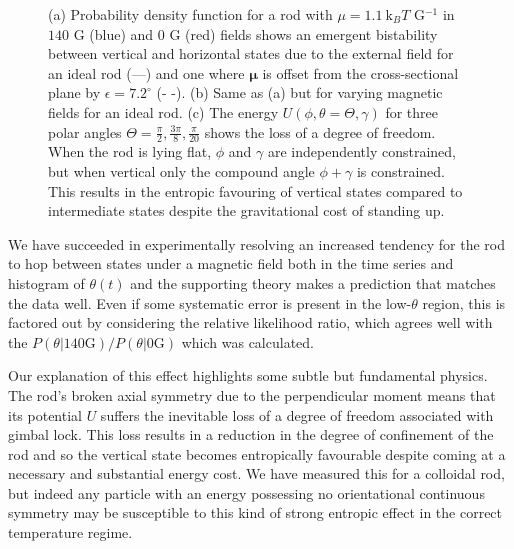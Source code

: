 \documentclass[aps,prl,reprint,twocolumn,superscriptaddress,showpacs]{revtex4-1}
\newcommand{\vc}[1]{\boldsymbol{#1}}
\newcommand{\kk}{\mathrm{k}_B}
\begin{document}
\begin{figure}
    \caption{\footnotesize (a) Probability density function for a rod with $\mu=1.1\ \kk T$ G$^{-1}$ in $140$ G (blue) and $0$ G (red) fields shows an emergent bistability between vertical and horizontal states due to the external field for an ideal rod (---) and one where $\vc{\mu}$ is offset from the cross-sectional plane by $\epsilon=7.2^\circ$ (- -). (b) Same as (a) but for varying magnetic fields for an ideal rod. (c) The energy $U(\phi,\theta=\Theta,\gamma)$ for three polar angles $\Theta=\frac{\pi}{2},\frac{3\pi}{8},\frac{\pi}{20}$ shows the loss of a degree of freedom. When the rod is lying flat, $\phi$ and $\gamma$ are independently constrained, but when vertical only the compound angle $\phi+\gamma$ is constrained. This results in the entropic favouring of vertical states compared to intermediate states despite the gravitational cost of standing up. \label{theory}}
\end{figure}
%
%
%
%
%
%
%
 We have succeeded in experimentally resolving an increased tendency for the rod to hop between states under a magnetic field both in the time series and histogram of $\theta(t)$ and the supporting theory makes a prediction that matches the data well. Even if some systematic error is present in the low-$\theta$ region, this is factored out by considering the relative likelihood ratio, which agrees well with the $P(\theta|140 \text{G})/P(\theta|0 \text{G})$ which was calculated.

Our explanation of this effect highlights some subtle but fundamental physics. The rod's broken axial symmetry due to the perpendicular moment means that its potential $U$ suffers the inevitable loss of a degree of freedom associated with gimbal lock. This loss results in a reduction in the degree of confinement of the rod and so the vertical state becomes entropically favourable despite coming at a necessary and substantial energy cost. We have measured this for a colloidal rod, but indeed any particle with an energy possessing no orientational continuous symmetry may be susceptible to this kind of strong entropic effect in the correct temperature regime.
  
\end{document}
